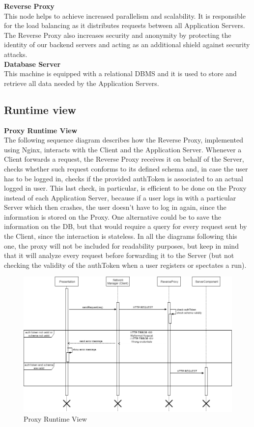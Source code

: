 \documentclass[titlepage]{article}
\begin{document}
{\bf Reverse Proxy }\\ 
This node helps to achieve increased parallelism and scalability. It is responsible for the load balancing as it distributes requests between all Application Servers. The Reverse Proxy also increases security and anonymity by protecting the identity of our backend servers and acting as an additional shield against security attacks.\\

{\bf Database Server }\\ 
This machine is equipped with a relational DBMS and it is used to store and retrieve all data needed by the Application Servers. 

\pagebreak

\subsection{Runtime view}

{\bf Proxy Runtime View }\\ 
The following sequence diagram describes how the Reverse Proxy, implemented using Nginx, interacts with the Client and the Application Server.
Whenever a Client forwards a request, the Reverse Proxy receives it on behalf of the Server, checks whether such request conforms to its defined schema and, in case the user has to be logged in, checks if the provided authToken is associated to an actual logged in user. This last check, in particular, is efficient to be done on the Proxy instead of each Application Server, because if a user logs in with a particular Server which then crashes, the user doesn’t have to log in again, since the information is stored on the Proxy. One alternative could be to save the information on the DB, but that would require a query for every request sent by the Client, since the interaction is stateless.
In all the diagrams following this one, the proxy will not be included for readability purposes, but keep in mind that it will analyze every request before forwarding it to the Server (but not checking the validity of the authToken when a user registers or spectates a run).

\begin{figure}[H]
	\center
  	\includegraphics[width=13cm]{Proxy.png}
  	\caption{Proxy Runtime View}
 	\label{fig:PROXY}
\end{figure}
\end{document}
